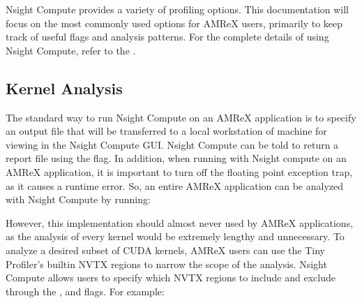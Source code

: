 \documentclass[letterpaper,10pt,english]{sphinxmanual}
\begin{document}
\sphinxAtStartPar
Nsight Compute provides a variety of profiling options.  This documentation will focus on the
most commonly used options for AMReX users, primarily to keep track of useful flags and analysis
patterns.  For the complete details of using Nsight Compute, refer to the .


\subsection{Kernel Analysis}
\label{\detokenize{External_Profiling_Tools:kernel-analysis}}
\sphinxAtStartPar
The standard way to run Nsight Compute on an AMReX application is to specify an output file
that will be transferred to a local workstation of machine for viewing in the Nsight Compute GUI.
Nsight Compute can be told to return a report file using the  flag. In addition, when
running with Nsight compute on an AMReX application, it is important to turn off the floating
point exception trap, as it causes a runtime error.  So, an entire AMReX application can be
analyzed with Nsight Compute by running:

\begin{sphinxVerbatim}[commandchars=\\\{\}]
\end{sphinxVerbatim}

\sphinxAtStartPar
However, this implementation should almost never used by AMReX applications, as the analysis of
every kernel would be  extremely lengthy and unnecessary.  To analyze a desired subset of CUDA
kernels, AMReX users can use the Tiny Profiler’s built\sphinxhyphen{}in NVTX regions to narrow the scope of
the analysis.  Nsight Compute allows users to specify which NVTX regions to include and exclude
through the ,  and  flags. For example:

\begin{sphinxVerbatim}[commandchars=\\\{\}]
\end{sphinxVerbatim}
\end{document}
